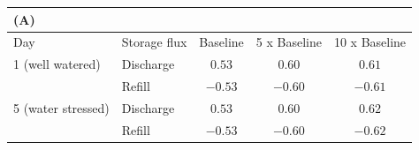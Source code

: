 \begin{tabular}{llccc}
\multicolumn{5}{l}{(A)} \\
\hline
Day & Storage flux & Baseline & 5 x Baseline & 10 x Baseline \\
\hline
1 (well watered) & Discharge & $0.53$ & $0.60$ & $0.61$ \\
 & Refill & $-0.53$ & $-0.60$ & $-0.61$ \\
\hline
5 (water stressed) & Discharge & $0.53$ & $0.60$ & $0.62$ \\
 & Refill & $-0.53$ & $-0.60$ & $-0.62$ \\
\hline
\end{tabular}
